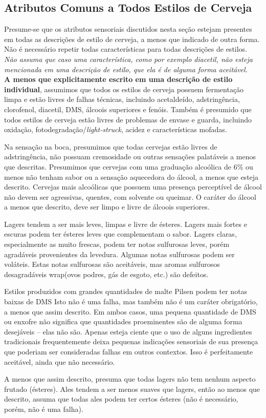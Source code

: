 \subsection*{Atributos Comuns a Todos Estilos de Cerveja}
Presume-se que os atributos sensoriais discutidos nesta seção estejam presentes em todas as descrições de estilo de cerveja, a menos que indicado de outra forma. Não é necessário repetir todas características para todas descrições de estilos. \textit{Não assuma que caso uma característica, como por exemplo diacetil, não esteja mencionada em uma descrição de estilo, que ela é de alguma forma aceitável.}\\
\textbf{A menos que explicitamente escrito em uma descrição de estilo individual}, assumimos que todos os estilos de cerveja possuem fermentação limpa e estão livres de falhas técnicas, incluindo acetaldeído, adstringência, clorofenol, diacetil, DMS, álcoois superiores e fenóis. Também é presumido que todos estilos de cerveja estão livres de problemas de envase e guarda, incluindo oxidação, fotodegradação/\textit{light-struck}, acidez e características mofadas.

Na sensação na boca, presumimos que todas cervejas estão livres de adstringência, não possuam cremosidade ou outras sensações palatáveis a menos que descritas. Presumimos que cervejas com uma graduação alcoólica de 6\% ou menos não tenham sabor ou a sensação aquecedora do álcool, a menos que esteja descrito. Cervejas mais alcoólicas que possuem uma presença perceptível de álcool não devem ser agressivas, quentes, com solvente ou queimar. O caráter do álcool a menos que descrito, deve ser limpo e livre de álcoois superiores.

Lagers tendem a ser mais leves, limpas e livre de ésteres. Lagers mais fortes e escuras podem ter ésteres leves que complementam o sabor. Lagers claras, especialmente as muito frescas, podem ter notas sulfurosas leves, porém agradáveis provenientes da levedura. Algumas notas sulfurosas podem ser voláteis. Estas notas sulfurosas são aceitáveis, mas aromas sulfurosos desagradáveis wrap(ovos podres, gás de esgoto, etc.) são defeitos.

Estilos produzidos com grandes quantidades de malte Pilsen podem ter notas baixas de DMS Isto não é uma falha, mas também não é um caráter obrigatório, a menos que assim descrito. Em ambos casos, uma pequena quantidade de DMS ou enxofre não significa que quantidades proeminentes são de alguma forma desejáveis – elas não são. Apenas esteja ciente que o uso de alguns ingredientes tradicionais frequentemente deixa pequenas indicações sensoriais de sua presença que poderiam ser consideradas falhas em outros contextos. Isso é perfeitamente aceitável, ainda que não necessário.

A menos que assim descrito, presuma que todas lagers não tem nenhum aspecto frutado (ésteres). Ales tendem a ser menos suaves que lagers, então ao menos que descrito, assuma que todas ales podem ter certos ésteres (não é necessário, porém, não é uma falha).
